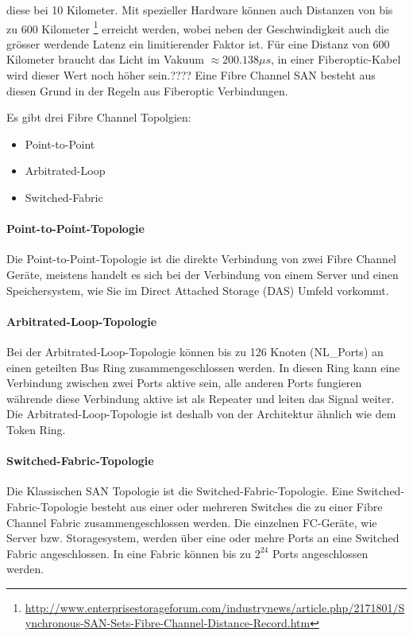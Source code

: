 diese bei 10 Kilometer. Mit spezieller Hardware können auch Distanzen von bis zu 600 Kilometer \footnote{\url{http://www.enterprisestorageforum.com/industrynews/article.php/2171801/Synchronous-SAN-Sets-Fibre-Channel-Distance-Record.htm}} erreicht werden, wobei neben der Geschwindigkeit auch die grösser werdende Latenz ein limitierender Faktor ist. Für eine Distanz von 600 Kilometer braucht das Licht im Vakuum $ \approx 200.138\mu s$, in einer Fiberoptic-Kabel wird dieser Wert noch höher sein.????
Eine Fibre Channel SAN besteht aus diesen Grund in der Regeln aus Fiberoptic  Verbindungen.

Es gibt drei Fibre Channel Topolgien:
\begin{itemize}
\item Point-to-Point
\item Arbitrated-Loop
\item Switched-Fabric
\end{itemize}

\paragraph*{Point-to-Point-Topologie}
Die Point-to-Point-Topologie ist die direkte Verbindung von zwei Fibre Channel Geräte, meistens handelt es sich bei der Verbindung von einem Server und einen Speichersystem, wie Sie im Direct Attached Storage (DAS) Umfeld vorkommt. \cite{Christopher2009}

\paragraph*{Arbitrated-Loop-Topologie}
Bei der Arbitrated-Loop-Topologie können bis zu 126 Knoten (NL\_Ports) an einen geteilten Bus Ring zusammengeschlossen werden. In diesen Ring kann eine Verbindung zwischen zwei Ports aktive sein, alle anderen Ports fungieren währende diese Verbindung aktive ist als Repeater und leiten das Signal weiter. Die Arbitrated-Loop-Topologie ist deshalb von der Architektur ähnlich wie dem Token Ring.\cite{Gupta2002}\cite{Christopher2009}

\paragraph*{Switched-Fabric-Topologie}
Die Klassischen SAN Topologie ist die Switched-Fabric-Topologie. Eine Switched-Fabric-Topologie besteht aus einer oder mehreren Switches die zu einer Fibre Channel Fabric zusammengeschlossen werden. Die einzelnen FC-Geräte, wie Server bzw. Storagesystem, werden über eine oder mehre Ports an eine Switched Fabric angeschlossen. In eine Fabric können bis zu $2^{24}$ Ports angeschlossen werden.\cite{Gupta2002}\cite{Christopher2009}


